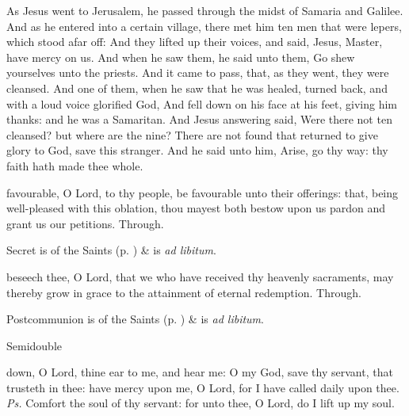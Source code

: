  As Jesus went to Jerusalem, he passed through the midst of Samaria and Galilee. And as he entered into a certain village, there met him ten men that were lepers, which stood afar off: And they lifted up their voices, and said, Jesus, Master, have mercy on us. And when he saw them, he said unto them, Go shew yourselves unto the priests. And it came to pass, that, as they went, they were cleansed. And one of them, when he saw that he was healed, turned back, and with a loud voice glorified God, And fell down on his face at his feet, giving him thanks: and he was a Samaritan. And Jesus answering said, Were there not ten cleansed? but where are the nine? There are not found that returned to give glory to God, save this stranger. And he said unto him, Arise, go thy way: thy faith hath made thee whole.


\secret
{} favourable, O Lord, to thy people, be favourable unto their offerings: that, being well-pleased with this oblation, thou mayest both bestow upon us pardon and grant us our petitions. Through.
\begin{rubric}
     Secret is of the Saints (p. \pageref{SPSaints}) \&  is \emph{ad libitum}.
\end{rubric}


\postcommunion
{} beseech thee, O Lord, that we who have received thy heavenly sacraments, may thereby grow in grace to the attainment of eternal redemption. Through.
\begin{rubric}
     Postcommunion is of the Saints (p. \pageref{SPSaints}) \&  is \emph{ad libitum}.
\end{rubric}

\clearpage

\begin{inhead}
{Semidouble}
\end{inhead}

\properantiphonfix

\introit
{} down, O Lord, thine ear to me, and hear me: O my God, save thy servant, that trusteth in thee: have mercy upon me, O Lord, for I have called daily upon thee. \textit{Ps.} Comfort the soul of thy servant: for unto thee, O Lord, do I lift up my soul.

